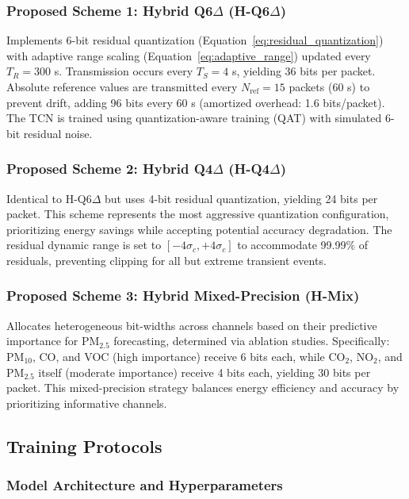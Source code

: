 \subsubsection{Proposed Scheme 1: Hybrid Q6$\Delta$ (H-Q6$\Delta$)}
Implements 6-bit residual quantization (Equation~\eqref{eq:residual_quantization}) with adaptive range scaling (Equation~\eqref{eq:adaptive_range}) updated every $T_R = 300$ s. Transmission occurs every $T_S = 4$ s, yielding 36 bits per packet. Absolute reference values are transmitted every $N_{\text{ref}} = 15$ packets (60 s) to prevent drift, adding 96 bits every 60 s (amortized overhead: 1.6 bits/packet). The TCN is trained using quantization-aware training (QAT) with simulated 6-bit residual noise.

\subsubsection{Proposed Scheme 2: Hybrid Q4$\Delta$ (H-Q4$\Delta$)}
Identical to H-Q6$\Delta$ but uses 4-bit residual quantization, yielding 24 bits per packet. This scheme represents the most aggressive quantization configuration, prioritizing energy savings while accepting potential accuracy degradation. The residual dynamic range is set to $[-4\sigma_c, +4\sigma_c]$ to accommodate 99.99\% of residuals, preventing clipping for all but extreme transient events.

\subsubsection{Proposed Scheme 3: Hybrid Mixed-Precision (H-Mix)}
Allocates heterogeneous bit-widths across channels based on their predictive importance for PM$_{2.5}$ forecasting, determined via ablation studies. Specifically: PM$_{10}$, CO, and VOC (high importance) receive 6 bits each, while CO$_2$, NO$_2$, and PM$_{2.5}$ itself (moderate importance) receive 4 bits each, yielding 30 bits per packet. This mixed-precision strategy balances energy efficiency and accuracy by prioritizing informative channels.

\subsection{Training Protocols}

\subsubsection{Model Architecture and Hyperparameters}

